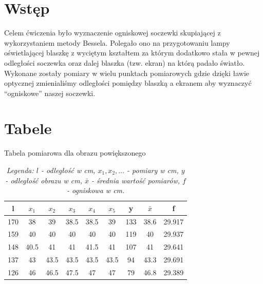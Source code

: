 \documentclass[12pt]{article}
\begin{document}
\section*{Wstęp}
Celem ćwiczenia było wyznaczenie ogniskowej soczewki skupiającej z wykorzystaniem metody Bessela. 
Polegało ono na przygotowaniu lampy oświetlającej blaszkę z wyciętym kształtem za którym dodatkowo 
stała w pewnej odległości soczewka oraz dalej blaszka (tzw. ekran) na którą padało światło.
Wykonane zostały pomiary w wielu punktach pomiarowych gdzie dzięki ławie optycznej zmienialiśmy 
odległości pomiędzy blaszką a ekranem aby wyznaczyć “ogniskowe” naszej soczewki.

\section*{Tabele}
\begin{table}[H]
    \centering
    \caption{Tabela pomiarowa dla obrazu powiększonego}
    \begin{tabular}{|c|c|c|c|c|c|c|c|c|}
        \hline
        \textbf{l} & \textbf{$x_1$} & \textbf{$x_2$} & \textbf{$x_3$} & \textbf{$x_4$} & \textbf{$x_5$} & \textbf{y} & \textbf{$\bar{x}$} & \textbf{f} \\ \hline
        170           & 38       & 39        & 38.5       & 38.5        & 39       & 133        & 38.6       & 29.917        \\ \hline
        159           & 40       & 40        & 40       & 40        & 40       & 119        & 40       & 29.937        \\ \hline
        148           & 40.5     & 41        & 41       & 41.5        & 41       & 107        & 41       & 29.641        \\ \hline
        137           & 43       & 43.5        & 43.5       & 43.5        & 43.5       & 94        & 43.3       & 29.691        \\ \hline
        126           & 46       & 46.5        & 47.5       & 47        & 47       & 79        & 46.8       & 29.389        \\ \hline
    \end{tabular}
    \captionsetup{font=small, justification=centering}
    \caption*{\textit{Legenda: $l$ - odległość w cm, $x_1, x_2, \dots$ - pomiary w cm, $y$ - odległość obrazu w cm, $\bar{x}$ - średnia wartość pomiarów, $f$ - ogniskowa w cm.}}
\end{table}
\end{document}
